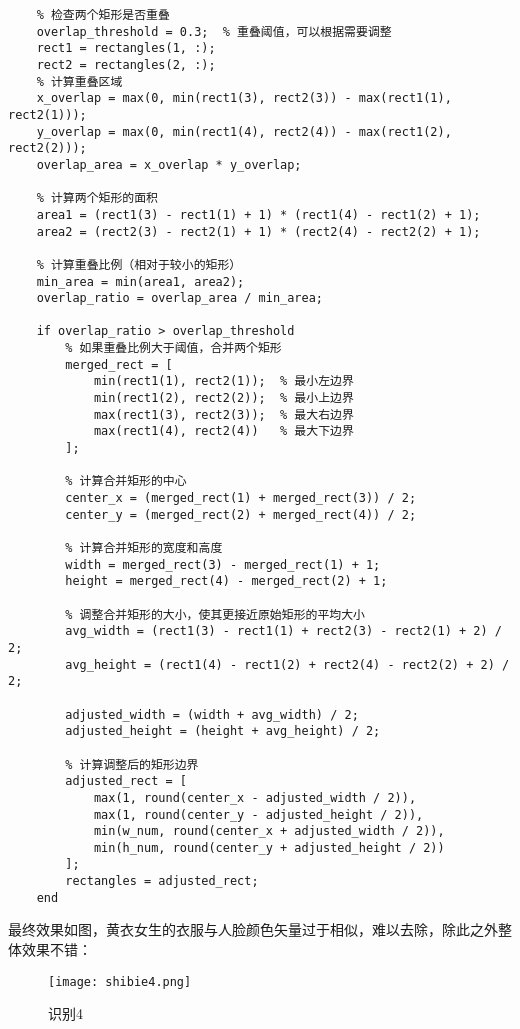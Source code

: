 \documentclass[12pt]{article}
\begin{document}
\begin{lstlisting}
    % 检查两个矩形是否重叠
    overlap_threshold = 0.3;  % 重叠阈值，可以根据需要调整
    rect1 = rectangles(1, :);
    rect2 = rectangles(2, :);
    % 计算重叠区域
    x_overlap = max(0, min(rect1(3), rect2(3)) - max(rect1(1), rect2(1)));
    y_overlap = max(0, min(rect1(4), rect2(4)) - max(rect1(2), rect2(2)));
    overlap_area = x_overlap * y_overlap;
    
    % 计算两个矩形的面积
    area1 = (rect1(3) - rect1(1) + 1) * (rect1(4) - rect1(2) + 1);
    area2 = (rect2(3) - rect2(1) + 1) * (rect2(4) - rect2(2) + 1);
    
    % 计算重叠比例（相对于较小的矩形）
    min_area = min(area1, area2);
    overlap_ratio = overlap_area / min_area;
    
    if overlap_ratio > overlap_threshold
        % 如果重叠比例大于阈值，合并两个矩形
        merged_rect = [
            min(rect1(1), rect2(1));  % 最小左边界
            min(rect1(2), rect2(2));  % 最小上边界
            max(rect1(3), rect2(3));  % 最大右边界
            max(rect1(4), rect2(4))   % 最大下边界
        ];
        
        % 计算合并矩形的中心
        center_x = (merged_rect(1) + merged_rect(3)) / 2;
        center_y = (merged_rect(2) + merged_rect(4)) / 2;
        
        % 计算合并矩形的宽度和高度
        width = merged_rect(3) - merged_rect(1) + 1;
        height = merged_rect(4) - merged_rect(2) + 1;
        
        % 调整合并矩形的大小，使其更接近原始矩形的平均大小
        avg_width = (rect1(3) - rect1(1) + rect2(3) - rect2(1) + 2) / 2;
        avg_height = (rect1(4) - rect1(2) + rect2(4) - rect2(2) + 2) / 2;
        
        adjusted_width = (width + avg_width) / 2;
        adjusted_height = (height + avg_height) / 2;
        
        % 计算调整后的矩形边界
        adjusted_rect = [
            max(1, round(center_x - adjusted_width / 2)),
            max(1, round(center_y - adjusted_height / 2)),
            min(w_num, round(center_x + adjusted_width / 2)),
            min(h_num, round(center_y + adjusted_height / 2))
        ];
        rectangles = adjusted_rect;
    end
\end{lstlisting}

最终效果如图，黄衣女生的衣服与人脸颜色矢量过于相似，难以去除，除此之外整体效果不错：

\begin{figure}[H]
    \centering
    \texttt{[image: shibie4.png]}
    \caption{识别4}
\end{figure}
\end{document}
